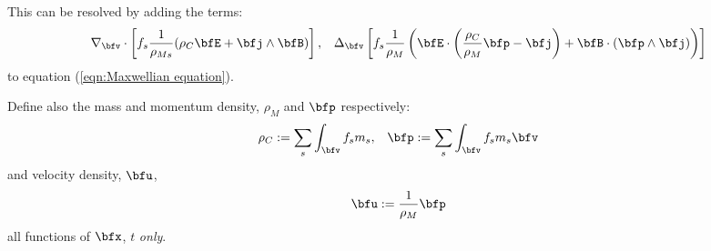     This can be resolved by adding the terms:
    \begin{align}
        \nabla_{\bfv}\cdot\left[f_{s}\frac{1}{\rho_{Ms}}(\rho_{C}\bfE + \bfj\wedge\bfB)\right],  &&
        \Delta_{\bfv}\left[f_{s}\frac{1}{\rho_{M}}\left(\bfE\cdot\left(\frac{\rho_{C}}{\rho_{M}}\bfp - \bfj\right) + \bfB\cdot(\bfp\wedge\bfj)\right)\right]
    \end{align}
    to equation (\ref{eqn:Maxwellian equation}).
    
    Define also the mass and momentum density, $\rho_{M}$ and $\bfp$ respectively:
    \begin{align}
        \rho_{C}  :=  \sum_{s}\int_{\bfv}f_{s}m_{s},  &&
        \bfp      :=  \sum_{s}\int_{\bfv}f_{s}m_{s}\bfv
    \end{align}
    and velocity density, $\bfu$,
    \begin{equation}
        \bfu  :=  \frac{1}{\rho_{M}}\bfp
    \end{equation}
    all functions of $\bfx$, $t$ \emph{only}.
    

